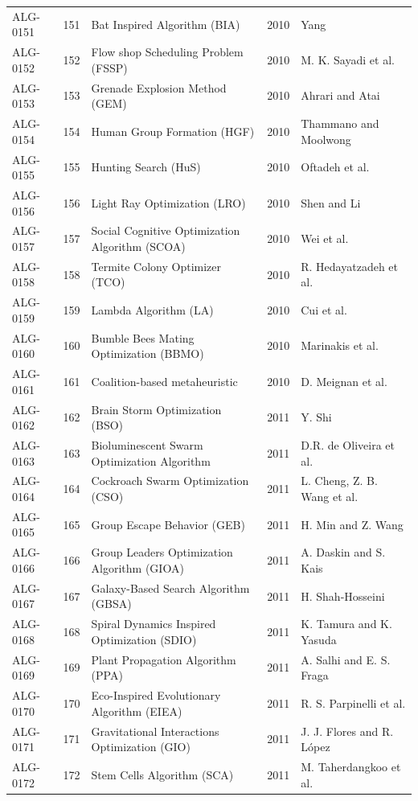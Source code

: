 \documentclass[8pt]{article}
\begin{document}
\begin{landscape}
\begin{longtable}{P{1.7cm}rP{10.0cm}rP{7.2cm}}
ALG-0151 & 151 & Bat Inspired Algorithm (BIA) & 2010 & Yang \\
ALG-0152 & 152 & Flow shop Scheduling Problem (FSSP) & 2010 & M. K. Sayadi et al. \\
ALG-0153 & 153 & Grenade Explosion Method (GEM) & 2010 & Ahrari and Atai \\
ALG-0154 & 154 & Human Group Formation (HGF) & 2010 & Thammano and Moolwong \\
ALG-0155 & 155 & Hunting Search (HuS) & 2010 & Oftadeh et al. \\
ALG-0156 & 156 & Light Ray Optimization (LRO) & 2010 & Shen and Li \\
ALG-0157 & 157 & Social Cognitive Optimization Algorithm (SCOA) & 2010 & Wei et al. \\
ALG-0158 & 158 & Termite Colony Optimizer (TCO) & 2010 & R. Hedayatzadeh et al. \\
ALG-0159 & 159 & Lambda Algorithm (LA) & 2010 & Cui et al. \\
ALG-0160 & 160 & Bumble Bees Mating Optimization (BBMO) & 2010 & Marinakis et al. \\
ALG-0161 & 161 & Coalition-based metaheuristic & 2010 & D. Meignan et al. \\
ALG-0162 & 162 & Brain Storm Optimization (BSO) & 2011 & Y. Shi \\
ALG-0163 & 163 & Bioluminescent Swarm Optimization Algorithm & 2011 & D.R. de Oliveira et al. \\
ALG-0164 & 164 & Cockroach Swarm Optimization (CSO) & 2011 & L. Cheng, Z. B. Wang et al. \\
ALG-0165 & 165 & Group Escape Behavior (GEB) & 2011 & H. Min and Z. Wang \\
ALG-0166 & 166 & Group Leaders Optimization Algorithm (GIOA) & 2011 & A. Daskin and S. Kais \\
ALG-0167 & 167 & Galaxy-Based Search Algorithm (GBSA) & 2011 & H. Shah-Hosseini \\
ALG-0168 & 168 & Spiral Dynamics Inspired Optimization (SDIO) & 2011 & K. Tamura and K. Yasuda \\
ALG-0169 & 169 & Plant Propagation Algorithm (PPA) & 2011 & A. Salhi and E. S. Fraga \\
ALG-0170 & 170 & Eco-Inspired Evolutionary Algorithm (EIEA) & 2011 & R. S. Parpinelli et al. \\
ALG-0171 & 171 & Gravitational Interactions Optimization (GIO) & 2011 & J. J. Flores and R. López \\
ALG-0172 & 172 & Stem Cells Algorithm (SCA) & 2011 & M. Taherdangkoo et al. \\

\end{longtable}
\end{landscape}
\end{document}
